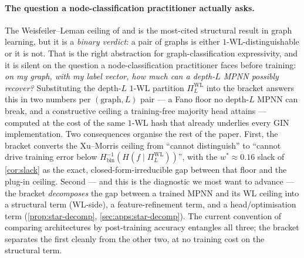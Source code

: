 \documentclass[10pt]{article}
\theoremstyle{definition}
\theoremstyle{remark}
\newcommand{\Hinv}{H_{\mathrm{bin}}^{-1}}
\begin{document}
\paragraph{The question a node-classification practitioner actually asks.}
The Weisfeiler--Leman ceiling of \citet{xu2019gin} and
\citet{morris2019wl} is the most-cited structural result in
graph learning, but it is a \emph{binary verdict}: a pair of
graphs is either $1$-WL-distinguishable or it is not. That is
the right abstraction for graph-classification expressivity, and
it is silent on the question a node-classification practitioner
faces before training: \emph{on my graph, with my label vector,
how much can a depth-$L$ MPNN possibly recover?} Substituting
the depth-$L$ $1$-WL partition $\Pi^{\mathrm{WL}}_{L}$ into the
bracket answers this in two numbers per $(\text{graph}, L)$
pair --- a Fano floor no depth-$L$ MPNN can break, and a
constructive ceiling a training-free majority head attains ---
computed at the cost of the same $1$-WL hash that already
underlies every GIN implementation. Two consequences organise
the rest of the paper. First, the bracket converts the
Xu--Morris ceiling from ``cannot distinguish'' to ``cannot
drive training error below
$\Hinv(H(f \mid \Pi^{\mathrm{WL}}_{L}))$'', with the
$w^{*} \approx 0.16$ slack of \cref{cor:slack} as the exact,
closed-form-irreducible gap between that floor and the plug-in
ceiling. Second --- and this is the diagnostic we most want to
advance --- the bracket \emph{decomposes} the gap between a
trained MPNN and its WL ceiling into a structural term
(WL-side), a feature-refinement term, and a head/optimisation
term (\cref{prop:star-decomp}, \cref{sec:apps:star-decomp}). The
current convention of comparing architectures by post-training
accuracy entangles all three; the bracket separates the first
cleanly from the other two, at no training cost on the
structural term.
\end{document}
